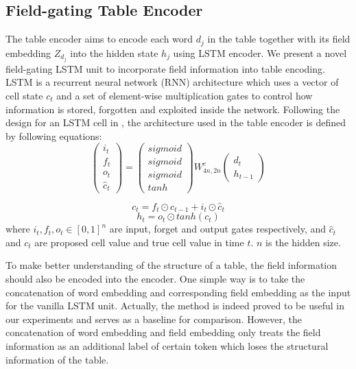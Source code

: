 \documentclass[letterpaper]{article} %
\begin{document}
\subsection{Field-gating Table Encoder}
The table encoder aims to encode each word $d_j$ in the table together with its field embedding $Z_{d_j}$ 
into the hidden state $h_j$ using LSTM encoder. 
We present a novel field-gating LSTM unit
to incorporate field information into table encoding.
LSTM is a recurrent neural network (RNN) architecture which uses a vector of cell state $c_t$ and a set of element-wise multiplication gates to control how information is stored, forgotten and exploited inside the network. Following the design for an LSTM cell in \cite{graves2013speech} , the architecture used in the table encoder is defined by following equations: 
\begin{equation}
\begin{pmatrix}
i_t\\
f_t\\
o_t\\
\hat{c}_t
\end{pmatrix}
= 
\begin{pmatrix}
sigmoid\\
sigmoid\\
sigmoid\\
tanh
\end{pmatrix}
W_{4n,2n}^c
\begin{pmatrix}
d_t\\
h_{t-1}
\end{pmatrix}
\label{encoder_eq1}
\end{equation}

\begin{equation}
	c_t = f_t \odot c_{t-1} + i_t \odot \hat{c}_t
\label{encoder_eq2}
\end{equation}
\begin{equation}
	h_t = o_t \odot tanh(c_t)
\label{encoder_eq3}
\end{equation}
where $i_t, f_t, o_t \in [0,1]^n$ are input, forget and output gates respectively, and $\hat{c}_t$ and $c_t$ are proposed cell value and true cell value in time $t$. $n$ is the hidden size. 

To make better understanding of the structure of a table, the field information should also be encoded into the encoder. 
One simple way is to take the concatenation of word embedding and corresponding field embedding as the input for the vanilla LSTM unit. Actually, the method is indeed proved to be useful in our experiments and serves as a baseline for comparison.  
However, the concatenation of word embedding and field embedding only treats the field information as an additional label of certain token which loses the structural information of the table. 
\end{document}
